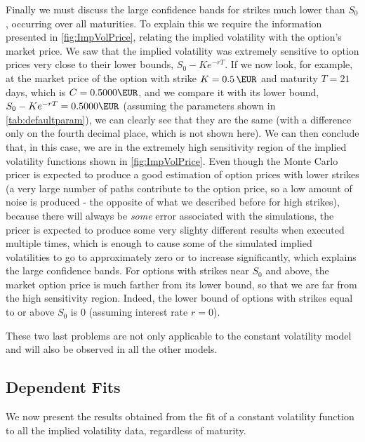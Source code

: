 Finally we must discuss the large confidence bands for strikes much lower than $S_0$, occurring over all maturities. To explain this we require the information presented in \autoref{fig:ImpVolPrice}, relating the implied volatility with the option's market price. We saw that the implied volatility was extremely sensitive to option prices very close to their lower bounds, $S_0-Ke^{-rT}$. If we now look, for example, at the market price of the option with strike $K=\SI{0.5}{\EUR}$ and maturity $T=21$ days, which is $C=0.5000\SI{}{\EUR}$, and we compare it with its lower bound, $S_0-Ke^{-rT}=0.5000\SI{}{\EUR}$ (assuming the parameters shown in \autoref{tab:defaultparam}), we can clearly see that they are the same (with a difference only on the fourth decimal place, which is not shown here). We can then conclude that, in this case, we are in the extremely high sensitivity region of the implied volatility functions shown in \autoref{fig:ImpVolPrice}.
Even though the Monte Carlo pricer is expected to produce a good estimation of option prices with lower strikes (a very large number of paths contribute to the option price, so a low amount of noise is produced - the opposite of what we described before for high strikes), because there will always be \emph{some} error associated with the simulations, the pricer is expected to produce some very slighty different results when executed multiple times, which is enough to cause some of the simulated implied volatilities to go to approximately zero or to increase significantly, which explains the large confidence bands. For options with strikes near $S_0$ and above, the market option price is much farther from its lower bound, so that we are far from the high sensitivity region. Indeed, the lower bound of options with strikes equal to or above $S_0$ is 0 (assuming interest rate $r=0$).

These two last problems are not only applicable to the constant volatility model and will also be observed in all the other models.




\newpage

\subsection{Dependent Fits}
We now present the results obtained from the fit of a constant volatility function to all the implied volatility data, regardless of maturity.

